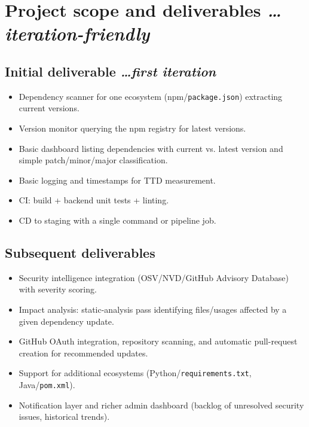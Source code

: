 \documentclass[11pt,a4paper]{article}
\newcommand{\BvrHint}[1]{%
  {\normalfont\normalsize\itshape\hfill #1}}
\begin{document}
\section{Project scope and deliverables %
\BvrHint{\ldots iteration-friendly}}
\subsection{Initial deliverable %
\BvrHint{\ldots first iteration}}
\begin{itemize}[leftmargin=0.7cm]
    \item Dependency scanner for one ecosystem (npm/\texttt{package.json}) extracting current versions.
    \item Version monitor querying the npm registry for latest versions.
    \item Basic dashboard listing dependencies with current vs. latest version and simple patch/minor/major classification.
    \item Basic logging and timestamps for TTD measurement.
    \item CI: build + backend unit tests + linting.
    \item CD to staging with a single command or pipeline job.
\end{itemize}

\subsection{Subsequent deliverables}
\begin{itemize}[leftmargin=0.7cm]
    \item Security intelligence integration (OSV/NVD/GitHub Advisory Database) with severity scoring.
    \item Impact analysis: static-analysis pass identifying files/usages affected by a given dependency update.
    \item GitHub OAuth integration, repository scanning, and automatic pull-request creation for recommended updates.
    \item Support for additional ecosystems (Python/\texttt{requirements.txt}, Java/\texttt{pom.xml}).
    \item Notification layer and richer admin dashboard (backlog of unresolved security issues, historical trends).
\end{itemize}
\end{document}
